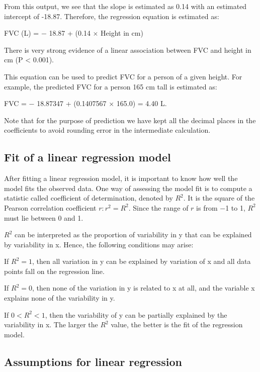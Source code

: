 \documentclass[
]{memoir}
\begin{document}
From this output, we see that the slope is estimated as 0.14 with an estimated intercept of -18.87. Therefore, the regression equation is estimated as:

FVC (L) = − 18.87 + (0.14 \(\times\) Height in cm)

There is very strong evidence of a linear association between FVC and height in cm (P \textless{} 0.001).

This equation can be used to predict FVC for a person of a given height. For example, the predicted FVC for a person 165 cm tall is estimated as:

FVC = − 18.87347 + (0.1407567 \(\times\) 165.0) = 4.40 L.

Note that for the purpose of prediction we have kept all the decimal places in the coefficients to avoid rounding error in the intermediate calculation.

\hypertarget{fit-of-a-linear-regression-model}{%
\subsection{Fit of a linear regression model}\label{fit-of-a-linear-regression-model}}

After fitting a linear regression model, it is important to know how well the model fits the observed data. One way of assessing the model fit is to compute a statistic called coefficient of determination, denoted by \(R^2\). It is the square of the Pearson correlation coefficient \(r: r^2 = R^2\). Since the range of \(r\) is from −1 to 1, \(R^2\) must lie between 0 and 1.

\(R^2\) can be interpreted as the proportion of variability in y that can be explained by variability in x. Hence, the following conditions may arise:

If \(R^2 = 1\), then all variation in y can be explained by variation of x and all data points fall on the regression line.

If \(R^2 = 0\), then none of the variation in y is related to x at all, and the variable x explains none of the variability in y.

If \(0 < R^2 <1\), then the variability of y can be partially explained by the variability in x. The larger the \(R^2\) value, the better is the fit of the regression model.

\hypertarget{assumptions-for-linear-regression}{%
\subsection{Assumptions for linear regression}\label{assumptions-for-linear-regression}}
\end{document}
